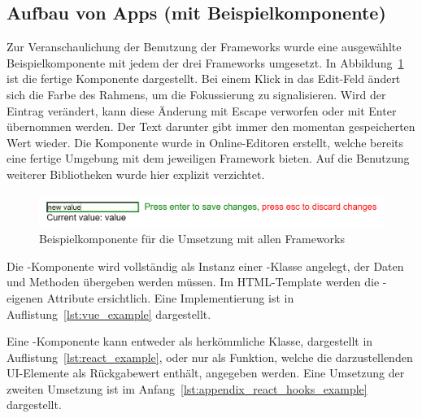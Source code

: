 \subsection{Aufbau von Apps (mit Beispielkomponente)}
Zur Veranschaulichung der Benutzung der Frameworks wurde eine ausgewählte Beispielkomponente mit jedem der drei Frameworks umgesetzt. In Abbildung~\ref{fig:example_component} ist die fertige Komponente dargestellt. Bei einem Klick in das Edit-Feld ändert sich die Farbe des Rahmens, um die Fokussierung zu signalisieren. Wird der Eintrag verändert, kann diese Änderung mit Escape verworfen oder mit Enter übernommen werden. Der Text darunter gibt immer den momentan gespeicherten Wert wieder. Die Komponente wurde in Online-Editoren erstellt, welche bereits eine fertige Umgebung mit dem jeweiligen Framework bieten. Auf die Benutzung weiterer Bibliotheken wurde hier explizit verzichtet.

\begin{figure}[htb]
    \centering
    \captionsetup{justification=centering}
    \includegraphics[width=\textwidth]{figures/example_component.png}
        \caption{Beispielkomponente für die Umsetzung mit allen Frameworks}\label{fig:example_component}
\end{figure}

Die -Komponente wird vollständig als Instanz einer -Klasse angelegt, der Daten und Methoden übergeben werden müssen. Im HTML-Template werden die -eigenen Attribute ersichtlich. Eine Implementierung ist in Auflistung~\ref{lst:vue_example} dargestellt.



Eine -Komponente kann entweder als herkömmliche Klasse, dargestellt in Auflistung~\ref{lst:react_example}, oder nur als Funktion, welche die darzustellenden UI-Elemente als Rückgabewert enthält, angegeben werden. Eine Umsetzung der zweiten Umsetzung ist im Anfang~\ref{lst:appendix_react_hooks_example} dargestellt.



